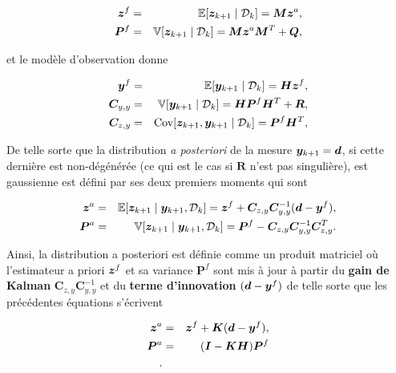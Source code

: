 \begin{eqnarray*}
    \bm z^f &=& \mathbb{E} [\bm z_{k+1} \mid \mathcal D_k] = \bm M \bm z^a,\\
    \bm  P^f &=& \mathbb{V} [\bm z_{k+1} \mid \mathcal D_k] = \bm M \bm z^a \bm M^T + \bm Q,
\end{eqnarray*}

et le modèle d'observation donne

\begin{eqnarray*}
    \bm{y}^f &=& \mathbb{E} [\bm y_{k+1} \mid \mathcal D_k] = \bm H \bm z^f,\\
    \bm C_{y,y}&=&\mathbb{V} [\bm y_{k+1} \mid \mathcal D_k] = \bm H \bm  P^f \bm H^T + \bm R, \\
    \bm C_{z,y} &=& \text{Cov}[\bm z_{k+1}, \bm y_{k+1}\mid \mathcal D_k] =\bm  P^f \bm H^T,
\end{eqnarray*}

De telle sorte que la distribution \textit{a posteriori} de la mesure $\bm{y}_{k+1} = \bm d$, si cette dernière est non-dégénérée (ce qui est le cas si $\bm R$ n'est pas singulière), est gaussienne est défini par ses deux premiers moments qui sont

\begin{eqnarray*}
    \bm z^a &=& \mathbb{E}[\bm z_{k+1} \mid \bm y_{k+1},\mathcal D_k] = \bm z^f + \bm C_{z,y} \bm C_{y,y}^{-1} (\bm d - \bm{y}^f), \\
    \bm  P^a &=& \mathbb{V}[\bm z_{k+1} \mid \bm y_{k+1},\mathcal D_k] = \bm  P^f - \bm C_{z,y} \bm C_{y,y}^{-1} \bm C_{z,y}^T.
\end{eqnarray*}

Ainsi, la distribution a posteriori est définie comme un produit matriciel où l'estimateur a priori $\bm z^f$ et sa variance $\bm  P^f$ sont mis à jour à partir du \textbf{gain de Kalman} $\bm C_{z,y} \bm C_{y,y}^{-1}$ et du \textbf{terme d'innovation} $(\bm{d} - \bm{y}^f)$ de telle sorte que les précédentes équations s'écrivent

\begin{eqnarray*}
    \bm z^a &=& \bm z^f + \bm K (\bm{d} - \bm{y}^f), \\
    \bm  P^a &=& (\bm I - \bm K\bm H)\bm  P^f \\.
\end{eqnarray*}


